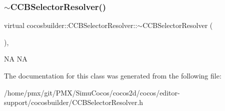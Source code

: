 \subsubsection{\texorpdfstring{$\sim$\+C\+C\+B\+Selector\+Resolver()}{~CCBSelectorResolver()}\hspace{0.1cm}{\footnotesize\ttfamily [2/2]}}
{\footnotesize\ttfamily virtual cocosbuilder\+::\+C\+C\+B\+Selector\+Resolver\+::$\sim$\+C\+C\+B\+Selector\+Resolver (\begin{DoxyParamCaption}{ }\end{DoxyParamCaption})\hspace{0.3cm}{\ttfamily [inline]}, {\ttfamily [virtual]}}

NA  NA 

The documentation for this class was generated from the following file\+:\begin{DoxyCompactItemize}
\item 
/home/pmx/git/\+P\+M\+X/\+Simu\+Cocos/cocos2d/cocos/editor-\/support/cocosbuilder/C\+C\+B\+Selector\+Resolver.\+h\end{DoxyCompactItemize}
